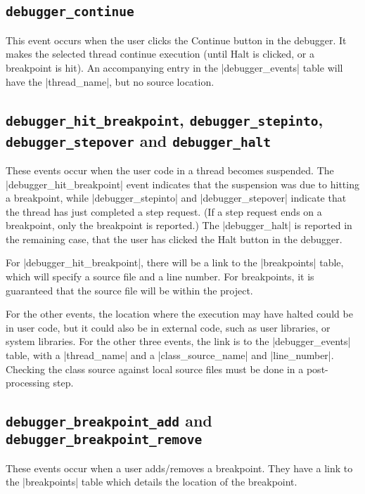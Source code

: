 \documentclass{book}
\begin{document}
\subsection{\lstinline|debugger_continue|}

This event occurs when the user clicks the Continue button in the debugger.
It makes the selected thread continue execution (until Halt is clicked, or a
breakpoint is hit).  An accompanying entry in the |debugger_events| table will
have the |thread_name|, but no source location.

\subsection{\lstinline|debugger_hit_breakpoint|,
  \lstinline|debugger_stepinto|, \lstinline|debugger_stepover| and
  \lstinline|debugger_halt|}

These events occur when the user code in a thread becomes suspended.  The
|debugger_hit_breakpoint| event indicates that the suspension was due to
hitting a breakpoint, while |debugger_stepinto| and |debugger_stepover|
indicate that the thread has just completed a step request.  (If a step
request ends on a breakpoint, only the breakpoint is reported.)  The
|debugger_halt| is reported in the remaining case, that the user has
clicked the Halt button in the debugger.

For |debugger_hit_breakpoint|, there will be a link to the |breakpoints|
table, which will specify a source file and a line number.  For breakpoints,
it is guaranteed that the source file will be within the project.

For the other events, the location where the execution may have halted could
be in user code, but it could also be in external code, such as user
libraries, or system libraries.  For the other three events, the link is to
the |debugger_events| table, with a |thread_name| and a |class_source_name|
and |line_number|.  Checking the class source against local source files must
be done in a post-processing step.


\subsection{\lstinline|debugger_breakpoint_add| and
  \lstinline|debugger_breakpoint_remove|}

These events occur when a user adds/removes a breakpoint.  They have a link to
the |breakpoints| table which details the location of the breakpoint.
\end{document}
